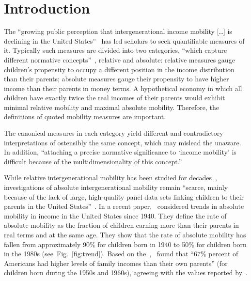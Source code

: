 \documentclass[12pt]{article}
\newcommand{\fref}[1]{Fig.~\ref{fig:#1}}
\numberwithin{equation}{section}
\begin{document}
\doublespacing

\section{Introduction} \label{sec:introduction}

The ``growing public perception that intergenerational income mobility [\ldots] is declining in the United States''~\citep[p.~141]{chetty2014united} has led scholars to seek quantifiable measures of it. Typically such measures are divided into two categories, ``which capture different normative concepts''~\citep[p.~1560]{chetty2014land}, relative and absolute: relative measures gauge children's propensity to occupy a different position in the income distribution than their parents; absolute measures gauge their propensity to have higher income than their parents in money terms. A hypothetical economy in which all children have exactly twice the real incomes of their parents would exhibit minimal relative mobility and maximal absolute mobility. Therefore, the definitions of quoted mobility measures are important.

The canonical measures in each category yield different and contradictory interpretations of ostensibly the same concept, which may mislead the unaware. In addition, ``attaching a precise normative significance to `income mobility' is difficult because of the multidimensionality of this concept.''~\citep[p.~588]{fields1999measurement}

While relative intergenerational mobility has been studied for decades~\citep{becker1979equilibrium,borjas1992ethnic,mazumder2005fortunate,aaronson2008intergenerational,lee2009trends,hauser2010intergenerational,corak2013income,chetty2014united,berman2016understanding}, investigations of absolute intergenerational mobility remain ``scarce, mainly because of the lack of large, high-quality panel data sets linking children to their parents in the United States''~\citep[p.~398]{chetty2017fading}. In a recent paper,~\citet{chetty2017fading} considered trends in absolute mobility in income in the United States since 1940. They define the rate of absolute mobility as the fraction of children earning more than their parents in real terms and at the same age. They show that the rate of absolute mobility has fallen from approximately 90\% for children born in 1940 to 50\% for children born in the 1980s (see~\fref{trend}). Based on the~\citet{PSID2017},~\citet{isaacs2007economic} found that ``$67\%$ percent of Americans had higher levels of family incomes than their own parents'' (for children born during the 1950s and 1960s), agreeing with the values reported by~\citet{chetty2017fading}.
\end{document}
